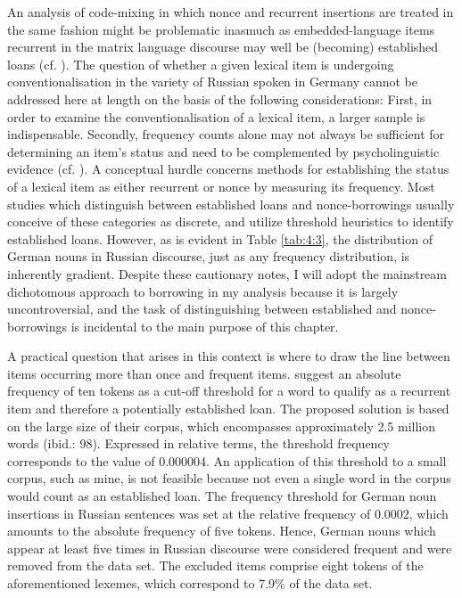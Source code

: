 \begin{sloppypar}
An analysis of code-mixing in which nonce and recurrent insertions are treated in the same fashion might be problematic inasmuch as embedded-language items recurrent in the matrix language discourse may well be (becoming) established loans (cf. \citealt{backus-13,myers-scotton-duelling-1993,poplack-etal-1988,poplack-dion-2012,poplack18}). The question of whether a given lexical item is undergoing conventionalisation in the variety of Russian spoken in Germany cannot be addressed here at length on the basis of the following considerations: First, in order to examine the conventionalisation of a lexical item, a larger sample is indispensable. Secondly, frequency counts alone may not always be sufficient for determining an item's status and need to be complemented by psycholinguistic evidence (cf. \citealt{blumenthal}). A conceptual hurdle concerns methods for establishing the status of a lexical item as either recurrent or nonce by measuring its frequency. Most studies which distinguish between established loans and nonce-borrowings usually conceive of these categories as discrete, and utilize threshold heuristics to identify established loans. However, as is evident in Table \ref{tab:4:3}, the distribution of German nouns in Russian discourse, just as any frequency distribution, is inherently gradient. Despite these cautionary notes, I will adopt the mainstream dichotomous approach to borrowing in my analysis because it is largely uncontroversial, and the task of distinguishing between established and nonce-borrowings is incidental to the main purpose of this chapter.
\end{sloppypar} 

A practical question that arises in this context is where to draw the line between items occurring more than once and frequent items. \citet{poplack-etal-1988} suggest an absolute frequency of ten tokens as a cut-off threshold for a word to qualify as a recurrent item and therefore a potentially established loan. The proposed solution is based on the large size of their corpus, which encompasses approximately 2.5 million words (ibid.: 98). Expressed in relative terms, the threshold frequency corresponds to the value of 0.000004. An application of this threshold to a small corpus, such as mine, is not feasible because not even a single word in the corpus would count as an established loan. The frequency threshold for German noun insertions in Russian sentences was set at the relative frequency of 0.0002, which amounts to the absolute frequency of five tokens. Hence, German nouns which appear at least five times in Russian discourse were considered frequent and were removed from the data set. The excluded items comprise eight tokens of the aforementioned lexemes, which correspond to 7.9\% of the data set.

